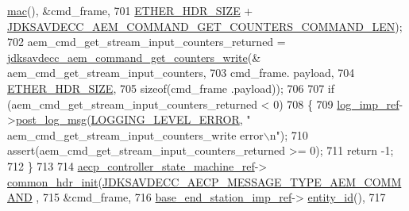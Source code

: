 \begin{DoxyCode}
      \hyperlink{classavdecc__lib_1_1end__station__imp_a08e1bd1861b3b8f447ea374a65ac11f9}{mac}(), &cmd\_frame,
701                                                         \hyperlink{namespaceavdecc__lib_a6c827b1a0d973e18119c5e3da518e65ca9512ad9b34302ba7048d88197e0a2dc0}{ETHER\_HDR\_SIZE} + 
      \hyperlink{group__command__get__counters_ga172bfd9e43b26f1b23588cdc172e6940}{JDKSAVDECC\_AEM\_COMMAND\_GET\_COUNTERS\_COMMAND\_LEN});
702     aem\_cmd\_get\_stream\_input\_counters\_returned = 
      \hyperlink{group__command__get__counters_ga9f15bd3b2fbf66748cde02c11f91af86}{jdksavdecc\_aem\_command\_get\_counters\_write}(&
      aem\_cmd\_get\_stream\_input\_counters,
703                                                                                            cmd\_frame.
      payload,
704                                                                                            
      \hyperlink{namespaceavdecc__lib_a6c827b1a0d973e18119c5e3da518e65ca9512ad9b34302ba7048d88197e0a2dc0}{ETHER\_HDR\_SIZE},
705                                                                                            \textcolor{keyword}{sizeof}(cmd\_frame
      .payload));
706 
707     \textcolor{keywordflow}{if} (aem\_cmd\_get\_stream\_input\_counters\_returned < 0)
708     \{
709         \hyperlink{namespaceavdecc__lib_acbe3e2a96ae6524943ca532c87a28529}{log\_imp\_ref}->\hyperlink{classavdecc__lib_1_1log_a68139a6297697e4ccebf36ccfd02e44a}{post\_log\_msg}(\hyperlink{namespaceavdecc__lib_a501055c431e6872ef46f252ad13f85cdaf2c4481208273451a6f5c7bb9770ec8a}{LOGGING\_LEVEL\_ERROR}, \textcolor{stringliteral}{"
      aem\_cmd\_get\_stream\_input\_counters\_write error\(\backslash\)n"});
710         assert(aem\_cmd\_get\_stream\_input\_counters\_returned >= 0);
711         \textcolor{keywordflow}{return} -1;
712     \}
713 
714     \hyperlink{namespaceavdecc__lib_a0b1b5aea3c0490f77cbfd9178af5be22}{aecp\_controller\_state\_machine\_ref}->
      \hyperlink{classavdecc__lib_1_1aecp__controller__state__machine_aafc737d7ed17a62fed9df6528f18d3ec}{common\_hdr\_init}(\hyperlink{group__aecp__message__type_ga4625ce189cc209f42deb0629f48faf69}{JDKSAVDECC\_AECP\_MESSAGE\_TYPE\_AEM\_COMMAND}
      ,
715                                                        &cmd\_frame,
716                                                        \hyperlink{classavdecc__lib_1_1descriptor__base__imp_a550c969411f5f3b69f55cc139763d224}{base\_end\_station\_imp\_ref}->
      \hyperlink{classavdecc__lib_1_1end__station__imp_a363b6c9664a0d701def9b17863e20ad3}{entity\_id}(),
717                                                        

\end{DoxyCode}
